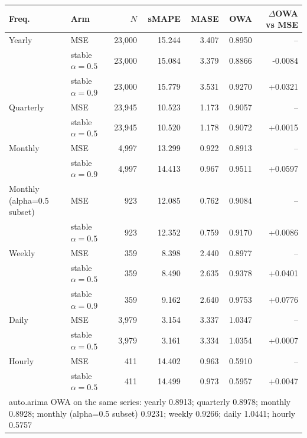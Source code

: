 \begin{tabular}{llrrrrr}
\toprule
Freq. & Arm & $N$ & sMAPE & MASE & OWA & $\Delta$OWA vs MSE \\
\midrule
Yearly & MSE & 23{,}000 & 15.244 & 3.407 & 0.8950 & -- \\
 & stable $\alpha=0.5$ & 23{,}000 & 15.084 & 3.379 & 0.8866 & -0.0084 \\
 & stable $\alpha=0.9$ & 23{,}000 & 15.779 & 3.531 & 0.9270 & +0.0321 \\
\addlinespace
Quarterly & MSE & 23{,}945 & 10.523 & 1.173 & 0.9057 & -- \\
 & stable $\alpha=0.5$ & 23{,}945 & 10.520 & 1.178 & 0.9072 & +0.0015 \\
\addlinespace
Monthly & MSE & 4{,}997 & 13.299 & 0.922 & 0.8913 & -- \\
 & stable $\alpha=0.9$ & 4{,}997 & 14.413 & 0.967 & 0.9511 & +0.0597 \\
\addlinespace
Monthly (alpha=0.5 subset) & MSE & 923 & 12.085 & 0.762 & 0.9084 & -- \\
 & stable $\alpha=0.5$ & 923 & 12.352 & 0.759 & 0.9170 & +0.0086 \\
\addlinespace
Weekly & MSE & 359 & 8.398 & 2.440 & 0.8977 & -- \\
 & stable $\alpha=0.5$ & 359 & 8.490 & 2.635 & 0.9378 & +0.0401 \\
 & stable $\alpha=0.9$ & 359 & 9.162 & 2.640 & 0.9753 & +0.0776 \\
\addlinespace
Daily & MSE & 3{,}979 & 3.154 & 3.337 & 1.0347 & -- \\
 & stable $\alpha=0.5$ & 3{,}979 & 3.161 & 3.334 & 1.0354 & +0.0007 \\
\addlinespace
Hourly & MSE & 411 & 14.402 & 0.963 & 0.5910 & -- \\
 & stable $\alpha=0.5$ & 411 & 14.499 & 0.973 & 0.5957 & +0.0047 \\
\midrule
\multicolumn{7}{l}{\footnotesize auto.arima OWA on the same series: yearly 0.8913; quarterly 0.8978; monthly 0.8928; monthly (alpha=0.5 subset) 0.9231; weekly 0.9266; daily 1.0441; hourly 0.5757} \\
\bottomrule
\end{tabular}
